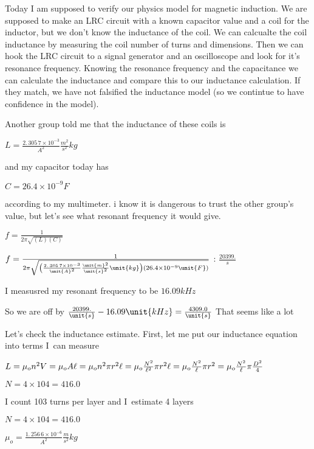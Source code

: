 \documentclass{sebase}
\begin{document}
Today I am supposed to verify our physics model for magnetic induction. We
are supposed to make an LRC circuit with a known capacitor value and a coil
for the inductor, but we don't know the inductance of the coil. We can
calcualte the coil inductance by measuring the coil number of turns and
dimensions. Then we can hook the LRC circuit to a signal generator and an
oscilloscope and look for it's resonance frequency. Knowing the resonance
frequency and the capacitance we can calculate the inductance and compare
this to our inductance calculation. If they match, we have not falsified the
inductance model (so we contintue to have confidence in the model).

Another group told me that the inductance of these coils is 

$L=\frac{2.\,\allowbreak 305\,7\times 10^{-3}}{\unit{A}^{2}}\frac{\unit{m}%
^{2}}{\unit{s}^{2}}\unit{kg}$

and my capacitor today has

$C=26.4\times 10^{-9}\unit{F}$

according to my multimeter. i know it is dangerous to trust the other
group's value, but let's see what resonant frequency it would give. 

$f=\frac{1}{2\pi \sqrt{\left( L\right) \left( C\right) }}$

$f=\frac{1}{2\pi \sqrt{\left( \frac{2.\,\allowbreak 305\,7\times 10^{-3}}{%
\unit{A}^{2}}\frac{\unit{m}^{2}}{\unit{s}^{2}}\unit{kg}\right) \left(
26.4\times 10^{-9}\unit{F}\right) }}\bigskip $ : $\frac{20399.}{\unit{s}}$

I measusred my resonant frequency to be $16.09\unit{kHz}$

So we are off by $\frac{20399.}{\unit{s}}-16.09\unit{kHz}=\allowbreak \frac{%
4309.0}{\unit{s}}$ That seems like a lot

\bigskip Let's check the inductance estimate. First, let me put our
inductance equation into terms I\ can measure

$L=\mu _{o}n^{2}V=\mu _{o}A\ell =\mu _{o}n^{2}\pi r^{2}\ell =\mu _{o}\frac{%
N^{2}}{\ell ^{2}}\pi r^{2}\ell =\mu _{o}\frac{N^{2}}{\ell }\pi r^{2}=\mu _{o}%
\frac{N^{2}}{\ell }\pi \frac{D^{2}}{4}$

\bigskip $N=4\times 104=\allowbreak 416.0$

\bigskip I count 103 turns per layer and I\ estimate 4 layers

\bigskip $N=4\times 104=\allowbreak 416.0$

$\mu _{o}=\allowbreak \frac{1.\,\allowbreak 256\,6\times 10^{-6}}{\unit{A}%
^{2}}\frac{\unit{m}}{\unit{s}^{2}}\unit{kg}$
\end{document}
